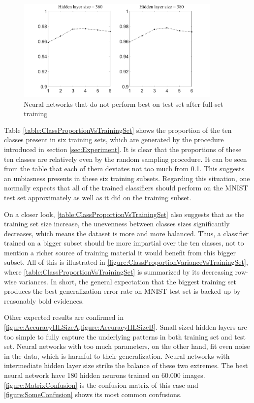 \documentclass[conference]{IEEEtran}
\begin{document}
\begin{figure}[tmbh]
\centering
\includegraphics[width=10cm]{fig2ilu_a.pdf}
\caption{Neural networks that do not perform best on test set after full-set training}
\label{figure:fig2ilu}
\end{figure}
Table \ref{table:ClassProportionVsTrainingSet} shows the proportion of the ten classes present in six training sets, which are generated by the procedure introduced in section \ref{sec:Experiment}. It is clear that the proportions of these ten classes are relatively even by the random sampling procedure. It can be seen from the table that each of them deviates not too much from 0.1. This suggests an unbiasness presents in these six training subsets. Regarding this situation, one normally expects that all of the trained classifiers should perform on the MNIST test set approximately as well as it did on the training subset.

On a closer look, \cref{table:ClassProportionVsTrainingSet} also suggests that as the training set size increase, the unevenness between classes sizes significantly decreases, which means the dataset is more and more balanced. Thus, a classifier trained on a bigger subset should be more impartial over the ten classes, not to mention a richer source of training material it would benefit from this bigger subset. All of this is illustrated in \cref{figure:ClassProportionVarianceVsTrainingSet}, where \cref{table:ClassProportionVsTrainingSet} is summarized by its decreasing row-wise variances. In short, the general expectation that the biggest training set produces the best generalization error rate on MNIST test set is backed up by reasonably bold evidences.

Other expected results are confirmed in \cref{figure:AccuracyHLSizeA,figure:AccuracyHLSizeB}. Small sized hidden layers are too simple to fully capture the underlying patterns in both training set and test set. Neural networks with too much parameters, on the other hand, fit even noise in the data, which is harmful to their generalization. Neural networks with intermediate hidden layer size strike the balance of these two extremes. The best neural network have 180 hidden neurons trained on 60.000 images. \cref{figure:MatrixConfusion} is the confusion matrix of this case and \cref{figure:SomeConfusion} shows its most common confusions.
\end{document}
